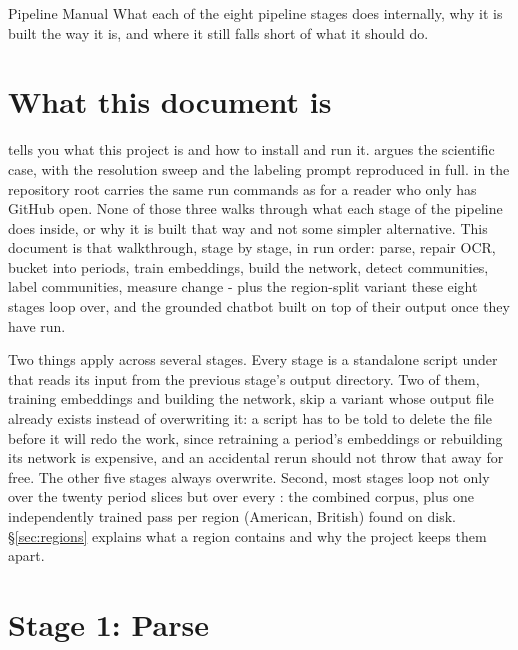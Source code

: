 \documentclass[11pt]{article}
\begin{document}
\specimencover
  {Pipeline Manual}
  {What each of the eight pipeline stages does internally, why it is
   built the way it is, and where it still falls short of what it should
   do.}
  {%
  }

\tableofcontents

\newpage

\section{What this document is}

 tells you what this project is and how to
install and run it.  argues the scientific case,
with the resolution sweep and the labeling prompt reproduced in full.
 in the repository root carries the same run commands as
 for a reader who only has GitHub open. None of
those three walks through what each stage of the pipeline does inside,
or why it is built that way and not some simpler alternative. This
document is that walkthrough, stage by stage, in run order: parse,
repair OCR, bucket into periods, train embeddings, build the network,
detect communities, label communities, measure change - plus the
region-split variant these eight stages loop over, and the grounded
chatbot built on top of their output once they have run.

Two things apply across several stages. Every stage is a standalone
script under  that
reads its input from the previous stage's output directory. Two of them,
training embeddings and building the network, skip a variant whose
output file already exists instead of overwriting it: a script has to
be told to delete the file before it will redo the work, since
retraining a period's embeddings or rebuilding its network is expensive,
and an accidental rerun should not throw that away for free. The other
five stages always overwrite. Second, most stages loop not only over the
twenty period slices but over every : the combined corpus,
plus one independently trained pass per region (American, British) found
on disk. \S\ref{sec:regions} explains what a region contains and why the
project keeps them apart.

\section{Stage 1: Parse}
\end{document}
